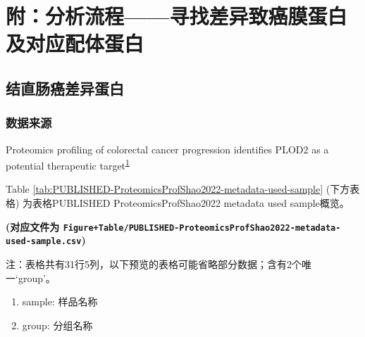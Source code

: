 \documentclass[
]{article}
\providecommand{\tightlist}{%
  \setlength{\itemsep}{0pt}\setlength{\parskip}{0pt}}
\begin{document}
\hypertarget{workflow1}{%
\section{附：分析流程------寻找差异致癌膜蛋白及对应配体蛋白}\label{workflow1}}

\hypertarget{ux7ed3ux76f4ux80a0ux764cux5deeux5f02ux86cbux767d}{%
\subsection{结直肠癌差异蛋白}\label{ux7ed3ux76f4ux80a0ux764cux5deeux5f02ux86cbux767d}}

\hypertarget{ux6570ux636eux6765ux6e90}{%
\subsubsection{数据来源}\label{ux6570ux636eux6765ux6e90}}

Proteomics profiling of colorectal cancer progression identifies PLOD2 as a potential therapeutic target\textsuperscript{\protect\hyperlink{ref-ProteomicsProfShao2022}{1}}

Table \ref{tab:PUBLISHED-ProteomicsProfShao2022-metadata-used-sample} (下方表格) 为表格PUBLISHED ProteomicsProfShao2022 metadata used sample概览。

\textbf{(对应文件为 \texttt{Figure+Table/PUBLISHED-ProteomicsProfShao2022-metadata-used-sample.csv})}

\begin{center}\begin{tcolorbox}[colback=gray!10, colframe=gray!50, width=0.9\linewidth, arc=1mm, boxrule=0.5pt]注：表格共有31行5列，以下预览的表格可能省略部分数据；含有2个唯一`group'。
\end{tcolorbox}
\end{center}
\begin{center}\begin{tcolorbox}[colback=gray!10, colframe=gray!50, width=0.9\linewidth, arc=1mm, boxrule=0.5pt]\begin{enumerate}\tightlist
\item sample:  样品名称
\item group:  分组名称
\end{enumerate}\end{tcolorbox}
\end{center}
\end{document}
